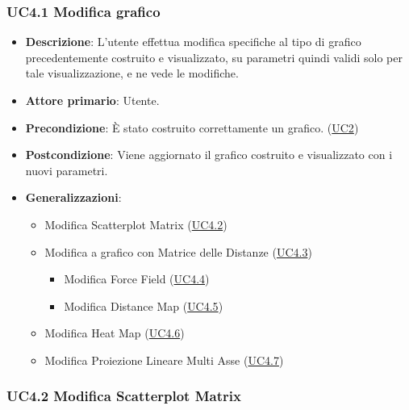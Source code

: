 \newpage
\subsubsection{UC4.1 Modifica grafico}
\label{ssub:uc4.1}

\begin{itemize}
    \item \textbf{Descrizione}: L’utente effettua modifica specifiche al tipo di grafico precedentemente costruito e visualizzato, 
                                su parametri quindi validi solo per tale visualizzazione, e ne vede le modifiche.
	
    \item \textbf{Attore primario}: Utente.
    
    \item \textbf{Precondizione}:   È stato costruito correttamente un grafico. (\hyperref[sub:uc2]{UC2})

    \item \textbf{Postcondizione}:  Viene aggiornato il grafico costruito e visualizzato con i nuovi parametri.

    \item \textbf{Generalizzazioni}:
        \begin{itemize}
            \item Modifica Scatterplot Matrix (\hyperref[ssub:uc4.2]{UC4.2})
            \item Modifica a grafico con Matrice delle Distanze (\hyperref[ssub:uc4.3]{UC4.3})
            \begin{itemize}
                \item Modifica Force Field (\hyperref[ssub:uc4.4]{UC4.4})
                \item Modifica Distance Map (\hyperref[ssub:uc4.5]{UC4.5})
             \end{itemize}
            \item Modifica Heat Map (\hyperref[ssub:uc4.6]{UC4.6})
            \item Modifica Proiezione Lineare Multi Asse (\hyperref[ssub:uc4.7]{UC4.7})
        \end{itemize}
\end{itemize}

\subsubsection{UC4.2 Modifica Scatterplot Matrix}
\label{ssub:uc4.2}

